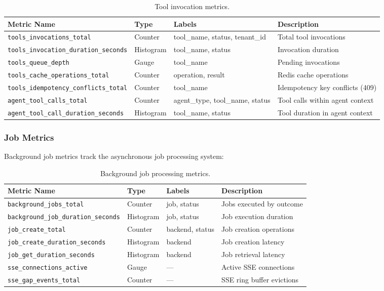 \begin{table}[ht]
\centering
\caption{Tool invocation metrics.}
\label{tab:tool-metrics}
\small
\begin{tabularx}{\textwidth}{lllX}
\hline
\textbf{Metric Name} & \textbf{Type} & \textbf{Labels} & \textbf{Description} \\
\hline
\texttt{tools\_invocations\_total} & Counter & tool\_name, status, tenant\_id & Total tool invocations \\
\texttt{tools\_invocation\_duration\_seconds} & Histogram & tool\_name, status & Invocation duration \\
\texttt{tools\_queue\_depth} & Gauge & tool\_name & Pending invocations \\
\texttt{tools\_cache\_operations\_total} & Counter & operation, result & Redis cache operations \\
\texttt{tools\_idempotency\_conflicts\_total} & Counter & tool\_name & Idempotency key conflicts (409) \\
\texttt{agent\_tool\_calls\_total} & Counter & agent\_type, tool\_name, status & Tool calls within agent context \\
\texttt{agent\_tool\_call\_duration\_seconds} & Histogram & tool\_name, status & Tool duration in agent context \\
\hline
\end{tabularx}
\end{table}

\subsubsection{Job Metrics}

Background job metrics track the asynchronous job processing system:

\begin{table}[ht]
\centering
\caption{Background job processing metrics.}
\label{tab:job-metrics}
\small
\begin{tabularx}{\textwidth}{lllX}
\hline
\textbf{Metric Name} & \textbf{Type} & \textbf{Labels} & \textbf{Description} \\
\hline
\texttt{background\_jobs\_total} & Counter & job, status & Jobs executed by outcome \\
\texttt{background\_job\_duration\_seconds} & Histogram & job, status & Job execution duration \\
\texttt{job\_create\_total} & Counter & backend, status & Job creation operations \\
\texttt{job\_create\_duration\_seconds} & Histogram & backend & Job creation latency \\
\texttt{job\_get\_duration\_seconds} & Histogram & backend & Job retrieval latency \\
\texttt{sse\_connections\_active} & Gauge & --- & Active SSE connections \\
\texttt{sse\_gap\_events\_total} & Counter & --- & SSE ring buffer evictions \\
\hline
\end{tabularx}
\end{table}

